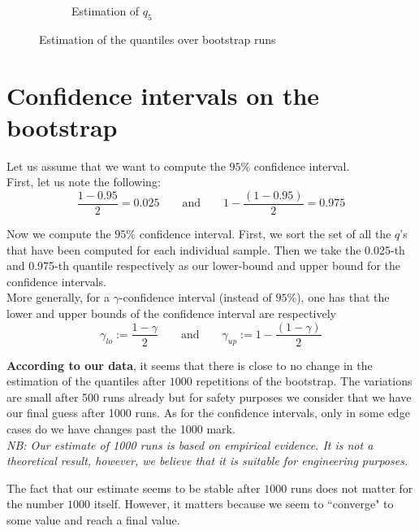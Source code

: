 \documentclass{article}
\begin{document}
\begin{figure}
\begin{subfigure}{.84\textwidth}
        \caption{Estimation of $q_5$}
    \end{subfigure}
    \caption{Estimation of the quantiles over bootstrap runs}
    \label{fig: estimation of quantiles}
\end{figure}

\section{Confidence intervals on the bootstrap}
\label{section: confidence intervals on the bootstrap}

Let us assume that we want to compute the $95\%$ confidence interval. \\
First, let us note the following:
\begin{equation}
    \label{eq: compute 0.95 CI bounds}
    \frac{1 - 0.95}{2} = 0.025 \qquad \mbox{and} \qquad 1 - \frac{(1 - 0.95)}{2} = 0.975
\end{equation}

Now we compute the $95\%$ confidence interval. First, we sort the set of all the $q$'s that have been computed for each individual sample. Then we take the 0.025-th and 0.975-th quantile respectively as our lower-bound and upper bound for the confidence intervals. \\
More generally, for a $\gamma$-confidence interval (instead of $95\%$), one has that the lower and upper bounds of the confidence interval are respectively
\[
    \gamma_{lo} := \frac{1 - \gamma}{2} \qquad \mbox{and} \qquad \gamma_{up} := 1 - \frac{(1 - \gamma)}{2}
\]


\textbf{According to our data}, it seems that there is close to no change in the estimation of the quantiles after $1000$ repetitions of the bootstrap. The variations are small after 500 runs already but for safety purposes we consider that we have our final guess after 1000 runs. As for the confidence intervals, only in some edge cases do we have changes past the 1000 mark. \\
\textit{NB: Our estimate of 1000 runs is based on empirical evidence. It is not a theoretical result, however, we believe that it is suitable for engineering purposes.}

The fact that our estimate seems to be stable after \(1000\) runs does not matter for the number \(1000\) itself. However, it matters because we seem to ``converge" to some value and reach a final value.
\end{document}
